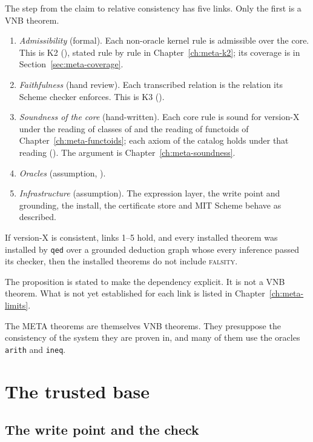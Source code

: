 The step from the claim to relative consistency has five links.  Only
the first is a VNB theorem.
\begin{enumerate}
\item \emph{Admissibility} (formal).  Each non-oracle kernel rule is
  admissible over the core.  This is K2 (), stated rule by rule in
  Chapter~\ref{ch:meta-k2}; its coverage is in
  Section~\ref{sec:meta-coverage}.
\item \emph{Faithfulness} (hand review).  Each transcribed relation is the
  relation its Scheme checker enforces.  This is K3 ().
\item \emph{Soundness of the core} (hand-written).  Each core rule is
  sound for version-X under the reading of classes of  and the
  reading of functoids of Chapter~\ref{ch:meta-functoids}; each axiom of
  the catalog holds under that reading ().  The argument is
  Chapter~\ref{ch:meta-soundness}.
\item \emph{Oracles} (assumption, ).
\item \emph{Infrastructure} (assumption).  The expression layer, the write
  point and grounding, the install, the certificate store and MIT Scheme
  behave as described.
\end{enumerate}

\begin{prop}\label{prop:meta-relcons}
If version-X is consistent, links 1--5 hold, and every installed theorem
was installed by \texttt{qed} over a grounded deduction graph whose every
inference passed its checker, then the installed theorems do not include
\textup{\textsc{falsity}}.
\end{prop}

The proposition is stated to make the dependency explicit.  It is not a
VNB theorem.  What is not yet established for each link is listed in
Chapter~\ref{ch:meta-limits}.

The META theorems are themselves VNB theorems.  They presuppose the
consistency of the system they are proven in, and many of them use the
oracles \texttt{arith} and \texttt{ineq}.

\section{The trusted base}\label{sec:meta-base}

\subsection{The write point and the check}

